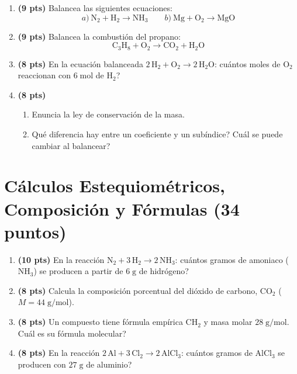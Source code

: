 \documentclass[12pt, letterpaper]{article}
\begin{document}
\begin{enumerate}[leftmargin=*]
  \item \textbf{(9 pts)} Balancea las siguientes ecuaciones:
        \[
          a)\ \text{N}_2 + \text{H}_2 \rightarrow \text{NH}_3 \qquad b)\ \text{Mg} + \text{O}_2 \rightarrow \text{MgO}
        \]

  \item \textbf{(9 pts)} Balancea la combustión del propano:
        \[
          \text{C}_3\text{H}_8 + \text{O}_2 \rightarrow \text{CO}_2 + \text{H}_2\text{O}
        \]

  \item \textbf{(8 pts)} En la ecuación balanceada $2\,\text{H}_2 + \text{O}_2 \rightarrow 2\,\text{H}_2\text{O}$: \textquestiondown cuántos moles de $\text{O}_2$ reaccionan con $6\;\text{mol}$ de $\text{H}_2$?

  \item \textbf{(8 pts)}
        \begin{enumerate}[label=\alph*)]
          \item Enuncia la ley de conservación de la masa.
          \item \textquestiondown Qué diferencia hay entre un coeficiente y un subíndice? \textquestiondown Cuál se puede cambiar al balancear?
        \end{enumerate}
\end{enumerate}

\newpage

\section{Cálculos Estequiométricos, Composición y Fórmulas (34 puntos)}

\begin{enumerate}[leftmargin=*]
  \item \textbf{(10 pts)} En la reacción $\text{N}_2 + 3\,\text{H}_2 \rightarrow 2\,\text{NH}_3$: \textquestiondown cuántos gramos de amoniaco ($\text{NH}_3$) se producen a partir de $6\;\text{g}$ de hidrógeno?

  \item \textbf{(8 pts)} Calcula la composición porcentual del dióxido de carbono, $\text{CO}_2$ ($M = 44\;\text{g/mol}$).

  \item \textbf{(8 pts)} Un compuesto tiene fórmula empírica $\text{CH}_2$ y masa molar $28\;\text{g/mol}$. \textquestiondown Cuál es su fórmula molecular?

  \item \textbf{(8 pts)} En la reacción $2\,\text{Al} + 3\,\text{Cl}_2 \rightarrow 2\,\text{AlCl}_3$: \textquestiondown cuántos gramos de $\text{AlCl}_3$ se producen con $27\;\text{g}$ de aluminio?
\end{enumerate}
\end{document}
